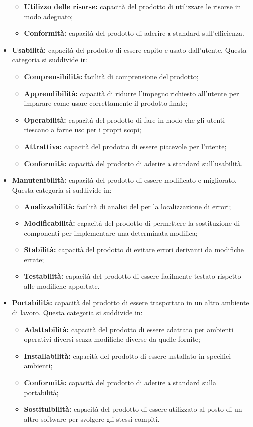 \documentclass{scalatekids-article}
\begin{document}
\begin{itemize}
\begin{itemize}
      \item{\textbf{Utilizzo delle risorse:} capacità del prodotto di utilizzare le risorse in modo adeguato;}
      \item{\textbf{Conformità:} capacità del prodotto di aderire a standard sull'efficienza.}
    \end{itemize}
  \item{\textbf{Usabilità:} capacità del prodotto di essere capito e usato dall'utente. Questa categoria si suddivide in:}
    \begin{itemize}
      \item{\textbf{Comprensibilità:} facilità di comprensione del prodotto;}
      \item{\textbf{Apprendibilità:} capacità di ridurre l'impegno richiesto all'utente per imparare come usare correttamente il prodotto finale;}
      \item{\textbf{Operabilità:} capacità del prodotto di fare in modo che gli utenti riescano a farne uso per i propri scopi;}
      \item{\textbf{Attrattiva:} capacità del prodotto di essere piacevole per l'utente;}
      \item{\textbf{Conformità:} capacità del prodotto di aderire a standard sull'usabilità.}
    \end{itemize}
  \item{\textbf{Manutenibilità:} capacità del prodotto di essere modificato e migliorato. Questa categoria si suddivide in:}
    \begin{itemize}
      \item{\textbf{Analizzabilità:} facilità di analisi del  per la localizzazione di errori;}
      \item{\textbf{Modificabilità:} capacità del prodotto di permettere la sostituzione di componenti per implementare una determinata modifica;}
      \item{\textbf{Stabilità:} capacità del prodotto di evitare errori derivanti da modifiche errate;}
      \item{\textbf{Testabilità:} capacità del prodotto di essere facilmente testato rispetto alle modifiche apportate.}
    \end{itemize}
  \item{\textbf{Portabilità:} capacità del prodotto di essere trasportato in un altro ambiente di lavoro. Questa categoria si suddivide in:}
    \begin{itemize}
      \item{\textbf{Adattabilità:} capacità del prodotto di essere adattato per ambienti operativi diversi senza modifiche diverse da quelle fornite;}
      \item{\textbf{Installabilità:} capacità del prodotto di essere installato in specifici ambienti;}
      \item{\textbf{Conformità:} capacità del prodotto di aderire a standard sulla portabilità;}
      \item{\textbf{Sostituibilità:} capacità del prodotto di essere utilizzato al posto di un altro software per svolgere gli stessi compiti.}
    \end{itemize}
\end{itemize}
\newpage
\end{document}
